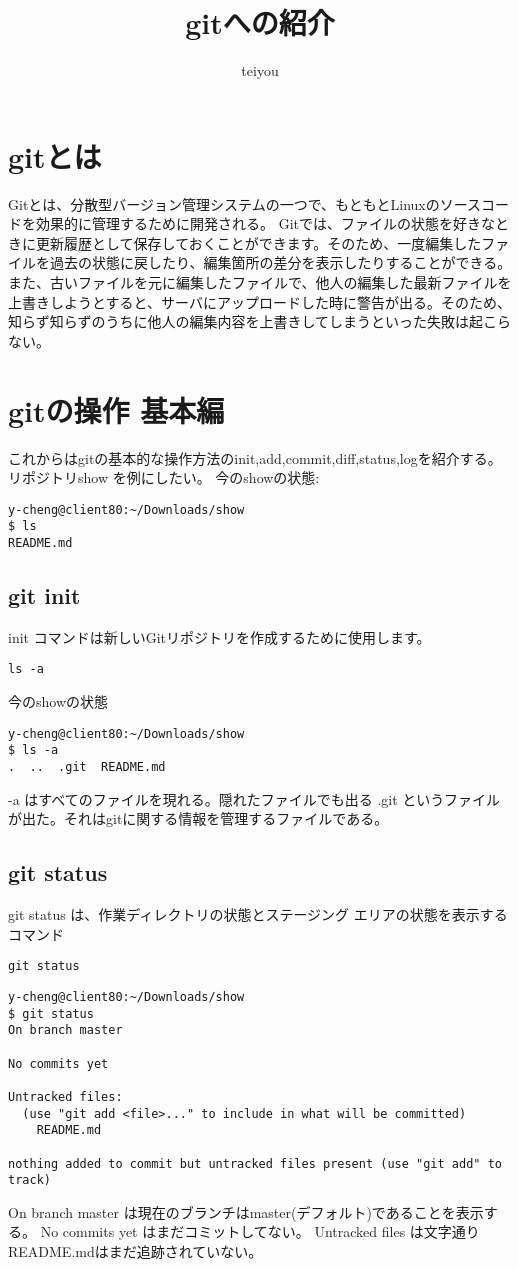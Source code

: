 \documentclass{article}
\title{gitへの紹介}
\author{teiyou}
\begin{document}
\maketitle
\section{gitとは}
 Gitとは、分散型バージョン管理システムの一つで、もともとLinuxのソースコードを効果的に管理するために開発される。
 \newline Gitでは、ファイルの状態を好きなときに更新履歴として保存しておくことができます。そのため、一度編集したファイルを過去の状態に戻したり、編集箇所の差分を表示したりすることができる。
\newline  また、古いファイルを元に編集したファイルで、他人の編集した最新ファイルを上書きしようとすると、サーバにアップロードした時に警告が出る。そのため、知らず知らずのうちに他人の編集内容を上書きしてしまうといった失敗は起こらない。
\section{gitの操作 基本編}
これからはgitの基本的な操作方法のinit,add,commit,diff,status,logを紹介する。
リポジトリshow を例にしたい。
今のshowの状態:
\begin{lstlisting}
y-cheng@client80:~/Downloads/show  
$ ls
README.md
\end{lstlisting}
\subsection{git init}
init コマンドは新しいGitリポジトリを作成するために使用します。
\begin{lstlisting}
ls -a
\end{lstlisting}
今のshowの状態
\begin{lstlisting}
y-cheng@client80:~/Downloads/show  
$ ls -a
.  ..  .git  README.md
\end{lstlisting}
-a はすべてのファイルを現れる。隠れたファイルでも出る
.git というファイルが出た。それはgitに関する情報を管理するファイルである。
\subsection{git status}
git status は、作業ディレクトリの状態とステージング エリアの状態を表示するコマンド
\begin{lstlisting}
git status
\end{lstlisting}
\begin{lstlisting}
y-cheng@client80:~/Downloads/show  
$ git status
On branch master

No commits yet

Untracked files:
  (use "git add <file>..." to include in what will be committed)
	README.md

nothing added to commit but untracked files present (use "git add" to track)

\end{lstlisting}
On branch master は現在のブランチはmaster(デフォルト)であることを表示する。
No commits yet はまだコミットしてない。
Untracked files は文字通りREADME.mdはまだ追跡されていない。
\end{document}

